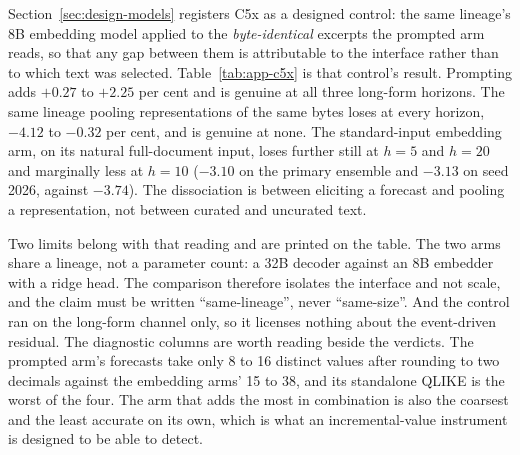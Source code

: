 Section~\ref{sec:design-models} registers C5x as a designed control: the
same lineage's 8B embedding model applied to the \emph{byte-identical}
excerpts the prompted arm reads, so that any gap between them is
attributable to the interface rather than to which text was selected.
Table~\ref{tab:app-c5x} is that control's result. Prompting adds
$+0.27$ to $+2.25$ per cent and is genuine at all three long-form
horizons. The same lineage pooling representations of the same bytes loses
at every horizon, $-4.12$ to $-0.32$ per cent, and is genuine at none. The
standard-input embedding arm, on its natural full-document input, loses
further still at $h{=}5$ and $h{=}20$ and marginally less at $h{=}10$ ($-3.10$
on the primary ensemble and $-3.13$ on seed 2026, against $-3.74$).
The dissociation is between eliciting a forecast and
pooling a representation, not between curated and uncurated text.

Two limits belong with that reading and are printed on the table. The two
arms share a lineage, not a parameter count: a 32B decoder against an 8B
embedder with a ridge head. The comparison therefore isolates the interface and
not scale, and the claim must be written ``same-lineage'', never
``same-size''. And the control ran on the long-form channel only, so it
licenses nothing about the event-driven residual. The diagnostic columns
are worth reading beside the verdicts. The prompted arm's forecasts take
only 8 to 16 distinct values after rounding to two decimals against the
embedding arms' 15 to 38, and its standalone QLIKE is the worst of the
four. The arm that adds the most in combination is also the coarsest and
the least accurate on its own, which is what an incremental-value
instrument is designed to be able to detect.

